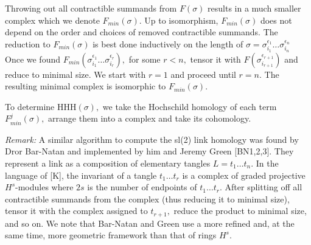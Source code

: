 \documentclass[12pt]{article}
\begin{document}
\vspace{0.1in} 

Throwing out all contractible summands from $F(\sigma)$ results 
in a much smaller complex which we denote $F_{min}(\sigma).$ 
Up to isomorphism, $F_{min}(\sigma)$ does not depend on 
the order and choices of removed contractible summands. 
The reduction to $F_{min}(\sigma)$ is best done inductively 
on the length of $\sigma=\sigma_{i_1}^{\epsilon_1}\dots \sigma_{i_n}^{\epsilon_n}$
Once we found
 $F_{min}(\sigma_{i_1}^{\epsilon_1}\dots \sigma_{i_r}^{\epsilon_r}),$ 
for some $r<n,$ tensor it with $F(\sigma_{i_{r+1}}^{\epsilon_{r+1}})$ 
and reduce to minimal size. We start with $r=1$ and proceed until $r=n.$ 
The resulting minimal complex is isomorphic to $F_{min}(\sigma).$ 

\vspace{0.1in} 


To determine $\mathrm{HHH}(\sigma),$ we take the Hochschild 
homology of each term $F^j_{min}(\sigma),$ arrange them 
into a complex and take its cohomology. 

\vspace{0.1in} 

\emph{Remark:} A similar algorithm to compute the sl(2) link homology was 
found by Dror Bar-Natan and implemented by him and 
Jeremy Green [BN1,2,3]. 
They represent a link as a composition of elementary tangles 
$L=t_1\dots t_n.$ In the language of [K], 
the invariant of a tangle $t_1\dots t_r$ is a complex 
of graded projective $H^s$-modules where $2s$ is the number of endpoints 
of $t_1\dots t_r.$ After splitting off all contractible summands from the complex
(thus reducing it to minimal size),
tensor it with the complex assigned to $t_{r+1},$ reduce the product to minimal 
size, and so on. We note that Bar-Natan and Green use a 
more refined and, at the same time, more geometric framework than that of 
rings $H^s.$ 

\vspace{0.1in} 
\end{document}
